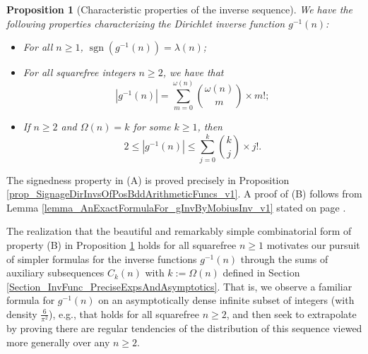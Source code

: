 \documentclass[11pt,reqno,a4letter]{article}
\numberwithin{figure}{section}
\numberwithin{table}{section}
\theoremstyle{plain}
\newtheorem{prop}[theorem]{Proposition}
\numberwithin{theorem}{section}
\theoremstyle{definition}
\begin{document}
\begin{prop}[Characteristic properties of the inverse sequence] 
\label{lemma_gInv_MxExample} 
We have the following properties characterizing the 
Dirichlet inverse function $g^{-1}(n)$: 
\begin{itemize} 

\item[\textbf{(A)}] For all $n \geq 1$, $\operatorname{sgn}(g^{-1}(n)) = \lambda(n)$; 
\item[\textbf{(B)}] For all squarefree integers $n \geq 2$, we have that 
     \[
     |g^{-1}(n)| = \sum_{m=0}^{\omega(n)} \binom{\omega(n)}{m} \times m!; 
     \]
\item[\textbf{(C)}] If $n \geq 2$ and $\Omega(n) = k$ for some $k \geq 1$, then 
     \[
     2 \leq |g^{-1}(n)| \leq \sum_{j=0}^{k} \binom{k}{j} \times j!. 
     \]
\end{itemize} 
\end{prop} 

The signedness property in (A) is proved precisely in 
Proposition \ref{prop_SignageDirInvsOfPosBddArithmeticFuncs_v1}. 
A proof of (B) follows from 
Lemma \ref{lemma_AnExactFormulaFor_gInvByMobiusInv_v1} 
stated on page \pageref{lemma_AnExactFormulaFor_gInvByMobiusInv_v1}. 

The realization that the beautiful and remarkably simple combinatorial form of property (B) 
in Proposition \ref{lemma_gInv_MxExample} holds for all squarefree $n \geq 1$ 
motivates our pursuit of simpler formulas for the inverse functions $g^{-1}(n)$ 
through the sums of auxiliary subsequences $C_k(n)$ with $k := \Omega(n)$ 
defined in Section \ref{Section_InvFunc_PreciseExpsAndAsymptotics}. 
That is, we observe a familiar formula for $g^{-1}(n)$ 
on an asymptotically dense infinite subset of integers (with density $\frac{6}{\pi^2}$), 
e.g., that holds for all squarefree $n \geq 2$, and then seek 
to extrapolate by proving there are regular tendencies of the distribution of this sequence viewed 
more generally over any $n \geq 2$. 
\end{document}
